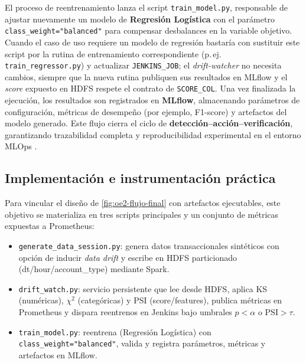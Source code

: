 El proceso de reentrenamiento lanza el script \texttt{train\_model.py}, responsable de ajustar nuevamente un modelo de \textbf{Regresión Logística} con el parámetro \texttt{class\_weight="balanced"} para compensar desbalances en la variable objetivo.  
Cuando el caso de uso requiere un modelo de regresión bastaría con sustituir este script por la rutina de entrenamiento correspondiente (p.\,ej. \texttt{train\_regressor.py}) y actualizar \texttt{JENKINS\_JOB}; el \textit{drift-watcher} no necesita cambios, siempre que la nueva rutina publiquen sus resultados en MLflow y el \textit{score} expuesto en HDFS respete el contrato de \texttt{SCORE\_COL}.  
Una vez finalizada la ejecución, los resultados son registrados en \textbf{MLflow}, almacenando parámetros de configuración, métricas de desempeño (por ejemplo, F1-score) y artefactos del modelo generado.  
Este flujo cierra el ciclo de \textbf{detección–acción–verificación}, garantizando trazabilidad completa y reproducibilidad experimental en el entorno MLOps \citep{Chen2022}.

\subsection{Implementación e instrumentación práctica}
\label{subsec:oe2-impl-practica}

Para vincular el diseño de \autoref{fig:oe2-flujo-final} con artefactos ejecutables, este objetivo se materializa en tres scripts principales y un conjunto de métricas expuestas a Prometheus:

\begin{itemize}
  \item \texttt{generate\_data\_session.py}: genera datos transaccionales sintéticos con opción de inducir \textit{data drift} y escribe en HDFS particionado (dt/hour/account\_type) mediante Spark. %
  \item \texttt{drift\_watch.py}: servicio persistente que lee desde HDFS, aplica KS (numéricas), $\chi^2$ (categóricas) y PSI (score/features), publica métricas en Prometheus y dispara reentrenos en Jenkins bajo umbrales $p<\alpha$ o $\mathrm{PSI}>\tau$. %
  \item \texttt{train\_model.py}: reentrena (Regresión Logística) con \texttt{class\_weight="balanced"}, valida y registra parámetros, métricas y artefactos en MLflow. %
\end{itemize}

